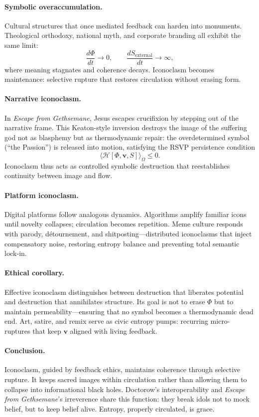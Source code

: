 \documentclass[12pt]{article}
\begin{document}
\paragraph{Symbolic overaccumulation.}
Cultural structures that once mediated feedback can harden into monuments.  
Theological orthodoxy, national myth, and corporate branding all exhibit the same limit:
\[
\frac{d\Phi}{dt} \rightarrow 0, \qquad \frac{dS_{\text{external}}}{dt} \rightarrow \infty,
\]
where meaning stagnates and coherence decays.  
Iconoclasm becomes maintenance: selective rupture that restores circulation without erasing form.

\paragraph{Narrative iconoclasm.}
In \emph{Escape from Gethsemane}, Jesus escapes crucifixion by stepping out of the narrative frame.  
This Keaton-style inversion destroys the image of the suffering god not as blasphemy but as thermodynamic repair: 
the overdetermined symbol (“the Passion”) is released into motion, satisfying the RSVP persistence condition
\[
\langle \mathcal{H}[\Phi,\mathbf v,S]\rangle_\Omega \le 0.
\]
Iconoclasm thus acts as controlled symbolic destruction that reestablishes continuity between image and flow.

\paragraph{Platform iconoclasm.}
Digital platforms follow analogous dynamics.  
Algorithms amplify familiar icons until novelty collapses; circulation becomes repetition.  
Meme culture responds with parody, détournement, and shitposting—distributed iconoclasms that inject compensatory noise, restoring entropy balance and preventing total semantic lock-in.

\paragraph{Ethical corollary.}
Effective iconoclasm distinguishes between destruction that liberates potential and destruction that annihilates structure.  
Its goal is not to erase $\Phi$ but to maintain permeability—ensuring that no symbol becomes a thermodynamic dead end.  
Art, satire, and remix serve as civic entropy pumps: recurring micro-ruptures that keep $\mathbf v$ aligned with living feedback.

\paragraph{Conclusion.}
Iconoclasm, guided by feedback ethics, maintains coherence through selective rupture.  
It keeps sacred images within circulation rather than allowing them to collapse into informational black holes.  
Doctorow’s interoperability and \emph{Escape from Gethsemane}’s irreverence share this function:  
they break idols not to mock belief, but to keep belief alive.  
Entropy, properly circulated, is grace.
\end{document}
